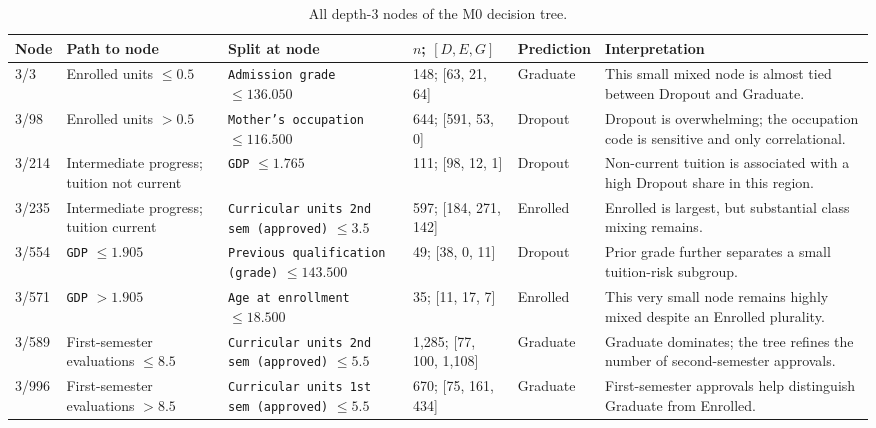 \begin{table}[H]
  \centering
  \scriptsize
  \setlength{\tabcolsep}{2pt}
  \renewcommand{\arraystretch}{1.05}
  \caption{All depth-3 nodes of the M0 decision tree.}
  \label{tab:e-level-3}
  \begin{tabular}{@{}L{1.2cm}L{2.2cm}L{3.2cm}L{2.0cm}L{1.4cm}L{3.6cm}@{}}
    \toprule
    Node & Path to node & Split at node & $n$; $[D,E,G]$ & Prediction & Interpretation \\
    /3 & Enrolled units $\leq 0.5$ & \texttt{Admission grade} $\leq 136.050$
      & 148; [63, 21, 64] & Graduate
      & This small mixed node is almost tied between Dropout and Graduate. \\
    3/98 & Enrolled units $>0.5$ & \texttt{Mother's occupation} $\leq 116.500$
      & 644; [591, 53, 0] & Dropout
      & Dropout is overwhelming; the occupation code is sensitive and only correlational. \\
    3/214 & Intermediate progress; tuition not current & \texttt{GDP} $\leq 1.765$
      & 111; [98, 12, 1] & Dropout
      & Non-current tuition is associated with a high Dropout share in this region. \\
    3/235 & Intermediate progress; tuition current & \texttt{Curricular units 2nd sem (approved)} $\leq 3.5$
      & 597; [184, 271, 142] & Enrolled
      & Enrolled is largest, but substantial class mixing remains. \\
    3/554 & \texttt{GDP} $\leq 1.905$ & \texttt{Previous qualification (grade)} $\leq 143.500$
      & 49; [38, 0, 11] & Dropout
      & Prior grade further separates a small tuition-risk subgroup. \\
    3/571 & \texttt{GDP} $>1.905$ & \texttt{Age at enrollment} $\leq 18.500$
      & 35; [11, 17, 7] & Enrolled
      & This very small node remains highly mixed despite an Enrolled plurality. \\
    3/589 & First-semester evaluations $\leq 8.5$ & \texttt{Curricular units 2nd sem (approved)} $\leq 5.5$
      & 1{,}285; [77, 100, 1{,}108] & Graduate
      & Graduate dominates; the tree refines the number of second-semester approvals. \\
    3/996 & First-semester evaluations $>8.5$ & \texttt{Curricular units 1st sem (approved)} $\leq 5.5$
      & 670; [75, 161, 434] & Graduate
      & First-semester approvals help distinguish Graduate from Enrolled. \\
    \bottomrule
  \end{tabular}
\end{table}

